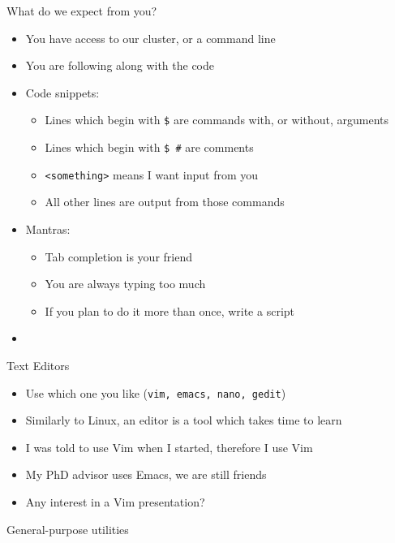 \documentclass[hyperref={pdfpagelabels=false},12pt]{beamer}
\newcommand{\mybutton}[2]{\hyperlink{#1}{\beamerbutton{{#2}}}}
\begin{document}
\begin{frame}{What do we expect from you?}
    \begin{itemize}
        \item You have access to our cluster, or a command line
        \item You are following along with the code
        \item Code snippets:
        \begin{itemize}
            \item Lines which begin with \texttt{\$} are commands with, or without, arguments
            \item Lines which begin with \texttt{\$ \#} are comments
            \item \texttt{\textless something\textgreater} means I want input from you
            \item All other lines are output from those commands
        \end{itemize}
        \item Mantras:
        \begin{itemize}
            \item Tab completion is your friend
            \item You are always typing too much
            \item If you plan to do it more than once, write a script
        \end{itemize}
        \item \color{red}{Type what you see, experiment!}
    \end{itemize}
\end{frame}

\begin{frame}{Text Editors}
    \begin{itemize}
        \item Use which one you like (\texttt{vim, emacs, nano, gedit}) 
        \item Similarly to Linux, an editor is a tool which takes time to learn
        \item I was told to use Vim when I started, therefore I use Vim
        \item My PhD advisor uses Emacs, we are still friends
        \item Any interest in a Vim presentation?
    \end{itemize}
\end{frame}

\begin{frame}[label=general-1]{General-purpose utilities}
\inputminted[bgcolor=lightgray,linenos,fontsize=\footnotesize]{bash}{code/general-purpose-utilities-1.txt}
\vfill
\mybutton{exercises-1}{Exercises (1)} \mybutton{exercises-2}{Exercises (2)}
\end{frame}
\end{document}
